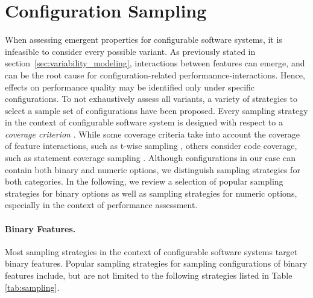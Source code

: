 \section{Configuration Sampling}\label{sec:configuration_sam}
When assessing emergent properties for configurable software systems, it is
infeasible to consider every possible variant. As previously stated in
section~\ref{sec:variability_modeling}, interactions between
features can emerge, and can be the root cause for configuration-related
performannce-interactions. Hence, effects on performance quality may be
identified only under specific configurations. To not exhaustively assess all
variants, a variety of strategies to select a sample set of configurations have been proposed.
Every sampling strategy in the context of configurable software system is
designed with respect to a \emph{coverage criterion} 
\citep{apel_feature-oriented_2013}. While some coverage criteria take into
account the coverage of feature interactions, such as t-wise sampling
\citep{williams_practical_1996}, others consider code coverage, such as
statement coverage sampling \citep{tartler_static_2014}.
Although configurations in our case can contain both binary and numeric options, we
distinguish sampling strategies for both categories. In the following, we
review a selection of popular sampling strategies for binary options as well as
sampling strategies for numeric options, especially in the context of
performance assessment.

\paragraph{Binary Features.}
Most sampling strategies in the context of configurable software systems
target binary features. Popular sampling strategies for sampling configurations
of binary features include, but are not limited to the following
\citep{apel_feature-oriented_2013,medeiros_comparison_2016} strategies listed in
Table \ref{tab:sampling}.

